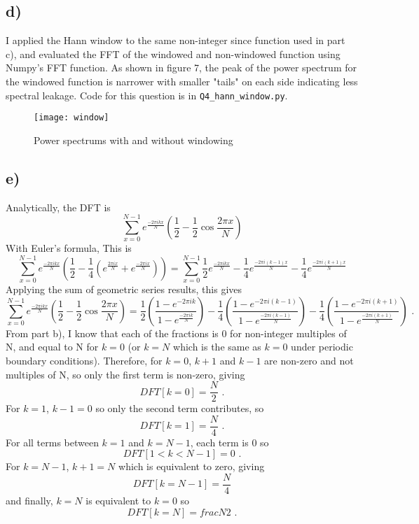 \documentclass{article}
\newcommand{\<}[1]{\left\langle #1 \right\rangle }
\begin{document}
\subsection{d)}
I applied the Hann window to the same non-integer since function used in part c), and evaluated the FFT of the windowed and non-windowed function using Numpy's FFT function. As shown in figure 7, the peak of the power spectrum for the windowed function is narrower with smaller "tails" on each side indicating less spectral leakage. Code for this question is in \texttt{Q4\_hann\_window.py}.

\begin{figure}[h]
	\caption{Power spectrums with and without windowing}
	\centering
	\texttt{[image: window]}
\end{figure}	

\subsection{e)}
Analytically, the DFT is 
\[\sum_{x=0}^{N-1} e^{\frac{-2\pi i k x}{N}} \left(\frac{1}{2} - \frac{1}{2}\cos{\frac{2\pi x}{N}}\right)\]
With Euler's formula, This is 
\[ \sum_{x=0}^{N-1} e^{\frac{-2\pi i k x}{N}} \left(\frac{1}{2} - \frac{1}{4}\left(e^{\frac{2\pi i x}{N}}+e^{\frac{-2\pi ix}{N}}\right)\right) = \sum_{x=0}^{N-1} \frac{1}{2}e^{\frac{-2\pi i k x}{N}} - \frac{1}{4}e^{\frac{-2\pi i (k-1) x}{N} } - \frac{1}{4}e^{\frac{-2\pi i (k+1) x}{N}}\]
Applying the sum of geometric series results, this gives
\[\sum_{x=0}^{N-1} e^{\frac{-2\pi i k x}{N}} \left(\frac{1}{2} - \frac{1}{2}\cos{\frac{2\pi x}{N}}\right) = \frac{1}{2}\left(\frac{1 - e^{-2\pi i k}}{1 - e^{\frac{-2\pi i k}{N}}}\right) - \frac{1}{4}\left(\frac{1 - e^{-2\pi i (k-1)}}{1 - e^{\frac{-2\pi i (k-1)}{N}}}\right) - \frac{1}{4}\left(\frac{1 - e^{-2\pi i (k+1)}}{1 - e^{\frac{-2\pi i (k+1)}{N}}}\right)\text{ .}\]
From part b), I know that each of the fractions is 0 for non-integer multiples of N, and equal to N for $k=0$ (or $k=N$ which is the same as $k=0$ under periodic boundary conditions). Therefore, for $k=0$, $k+1$ and $k-1$ are non-zero and not multiples of N, so only the first term is non-zero, giving
\[DFT[k=0] = \frac{N}{2} \text{ .}\]
For $k=1$, $k-1 = 0$ so only the second term contributes, so
\[DFT[k=1] = \frac{N}{4}\text{ .}\]
For all terms between $k=1$ and $k=N-1$, each term is 0 so 
\[DFT[1<k<N-1] = 0 \text{ .}\]
For $k = N-1$, $k+1 = N$ which is equivalent to zero, giving
\[DFT[k=N-1] = \frac{N}{4}\]
and finally, $k=N$ is equivalent to $k=0$ so
\[DFT[k=N] = frac{N}{2} \text{ .}\]
\end{document}
